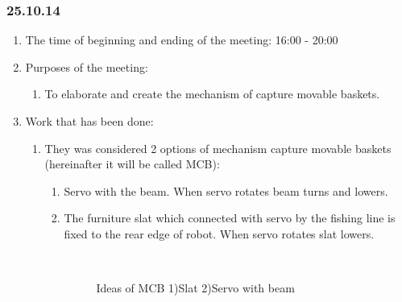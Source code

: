
\subsubsection{25.10.14}

\begin{enumerate}
	\item The time of beginning and ending of the meeting:
	16:00 - 20:00
	\item Purposes of the meeting:
	\begin{enumerate}
	  \item To elaborate and create the mechanism of capture movable baskets. 
	  
    \end{enumerate}
    
	\item Work that has been done:
	\begin{enumerate}
	  \item They was considered 2 options of mechanism capture movable baskets (hereinafter it will be called MCB):
	  \begin{enumerate}
	    \item Servo with the beam. When servo rotates beam turns and lowers.
	    
	    \item The furniture slat which connected with servo by the fishing line is fixed to the rear edge of robot. When servo rotates slat lowers.
	    
	    \begin{figure}[H]
	    	\begin{minipage}[h]{0.2\linewidth}
	    		\center   
	    	\end{minipage}
	    	\begin{minipage}[h]{0.6\linewidth}
	    		\caption{Ideas of MCB 1)Slat 2)Servo with beam}
	    	\end{minipage}
	    \end{figure}
	    

\end{enumerate}
\end{enumerate}
\end{enumerate}
